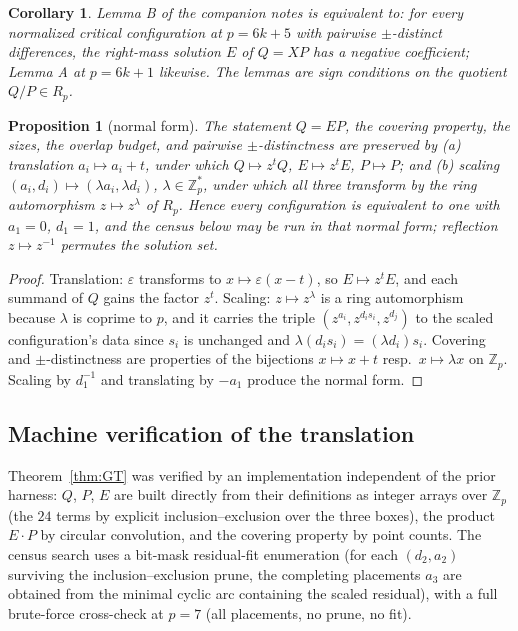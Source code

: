 \documentclass[11pt,a4paper]{article}
\numberwithin{equation}{section}
\theoremstyle{plain}
\newtheorem{corollary}[theorem]{Corollary}
\newtheorem{proposition}[theorem]{Proposition}
\theoremstyle{definition}
\theoremstyle{remark}
\newcommand{\Z}{\mathbb{Z}}
\begin{document}
\begin{corollary}\label{cor:signform}
Lemma B of the companion notes is equivalent to: for every normalized
critical configuration at $p=6k+5$ with pairwise $\pm$-distinct differences,
the right-mass solution $E$ of $Q=XP$ has a negative coefficient; Lemma A at
$p=6k+1$ likewise. The lemmas are sign conditions on the quotient
$Q/P\in R_p$.
\end{corollary}

\begin{proposition}[normal form]\label{prop:normalform}
The statement $Q=EP$, the covering property, the sizes, the overlap budget,
and pairwise $\pm$-distinctness are preserved by \textup{(a)} translation
$a_i\mapsto a_i+t$, under which $Q\mapsto z^{t}Q$, $E\mapsto z^{t}E$,
$P\mapsto P$; and \textup{(b)} scaling $(a_i,d_i)\mapsto(\lambda a_i,
\lambda d_i)$, $\lambda\in\Z_p^{*}$, under which all three transform by the
ring automorphism $z\mapsto z^{\lambda}$ of $R_p$. Hence every configuration
is equivalent to one with $a_1=0$, $d_1=1$, and the census below may be run
in that normal form; reflection $z\mapsto z^{-1}$ permutes the solution set.
\end{proposition}

\begin{proof}
Translation: $\varepsilon$ transforms to $x\mapsto\varepsilon(x-t)$, so
$E\mapsto z^tE$, and each summand of $Q$ gains the factor $z^t$. Scaling:
$z\mapsto z^\lambda$ is a ring automorphism because $\lambda$ is coprime to
$p$, and it carries the triple $(z^{a_i},z^{d_is_i},z^{d_j})$ to the scaled
configuration's data since $s_i$ is unchanged and
$\lambda(d_is_i)=(\lambda d_i)s_i$. Covering and $\pm$-distinctness are
properties of the bijections $x\mapsto x+t$ resp.\ $x\mapsto\lambda x$ on
$\Z_p$. Scaling by $d_1^{-1}$ and translating by $-a_1$ produce the normal
form.
\end{proof}

\subsection{Machine verification of the translation}\label{sec:gt-verify}

Theorem~\ref{thm:GT} was verified by an implementation independent of the
prior harness: $Q$, $P$, $E$ are built directly from their definitions as
integer arrays over $\Z_p$ (the $24$ terms by explicit inclusion--exclusion
over the three boxes), the product $E\cdot P$ by circular convolution, and
the covering property by point counts. The census search uses a
bit-mask residual-fit enumeration (for each $(d_2,a_2)$ surviving the
inclusion--exclusion prune, the completing placements $a_3$ are obtained
from the minimal cyclic arc containing the scaled residual), with a full
brute-force cross-check at $p=7$ (all placements, no prune, no fit).
\end{document}
